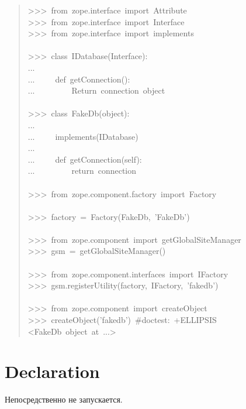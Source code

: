 \documentclass[a4paper,openany,twoside,final]{book}
\begin{document}
\begin{quote}{\ttfamily \raggedright \noindent
>{}>{}>~from~zope.interface~import~Attribute\\
>{}>{}>~from~zope.interface~import~Interface\\
>{}>{}>~from~zope.interface~import~implements\\
~\\
>{}>{}>~class~IDatabase(Interface):\\
...\\
...~~~~~def~getConnection():\\
...~~~~~~~~~\textquotedbl{}\textquotedbl{}\textquotedbl{}Return~connection~object\textquotedbl{}\textquotedbl{}\textquotedbl{}\\
~\\
>{}>{}>~class~FakeDb(object):\\
...\\
...~~~~~implements(IDatabase)\\
...\\
...~~~~~def~getConnection(self):\\
...~~~~~~~~~return~\textquotedbl{}connection\textquotedbl{}\\
~\\
>{}>{}>~from~zope.component.factory~import~Factory\\
~\\
>{}>{}>~factory~=~Factory(FakeDb,~'FakeDb')\\
~\\
>{}>{}>~from~zope.component~import~getGlobalSiteManager\\
>{}>{}>~gsm~=~getGlobalSiteManager()\\
~\\
>{}>{}>~from~zope.component.interfaces~import~IFactory\\
>{}>{}>~gsm.registerUtility(factory,~IFactory,~'fakedb')\\
~\\
>{}>{}>~from~zope.component~import~createObject\\
>{}>{}>~createObject('fakedb')~\#doctest:~+ELLIPSIS\\
<FakeDb~object~at~...>
}
\end{quote}


\section*{Declaration%
  \label{declaration}%
}

Непосредственно не запускается.
\end{document}
